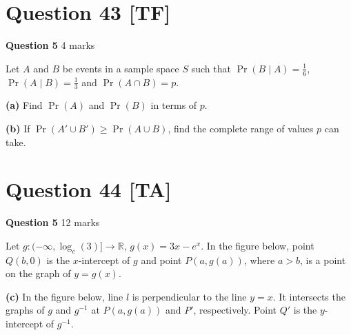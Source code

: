 \documentclass[10pt,a4paper]{article}
\begin{document}
\section*{Question 43 [TF]}

\textbf{Question 5} \hfill 4 marks

Let $A$ and $B$ be events in a sample space $S$ such that $\Pr(B \mid A) = \frac{1}{6}$, $\Pr(A \mid B) = \frac{1}{3}$ and $\Pr(A \cap B) = p$.

\textbf{(a)} Find $\Pr(A)$ and $\Pr(B)$ in terms of $p$.

\vspace{9\baselineskip}

\textbf{(b)} If $\Pr(A' \cup B') \geq \Pr(A \cup B)$, find the complete range of values $p$ can take.

\vspace{9\baselineskip}

\hrulefill

\section*{Question 44 [TA]}

\textbf{Question 5} \hfill 12 marks

Let $g : (-\infty, \log_e(3)] \to \mathbb{R}$, $g(x) = 3x - e^x$. In the figure below, point $Q(b,0)$ is the $x$-intercept of $g$ and point $P(a,g(a))$, where $a > b$, is a point on the graph of $y = g(x)$.

\begin{center}
\end{center}

\textbf{(c)} In the figure below, line $l$ is perpendicular to the line $y = x$. It intersects the graphs of $g$ and $g^{-1}$ at $P(a,g(a))$ and $P'$, respectively. Point $Q'$ is the $y$-intercept of $g^{-1}$.
\end{document}
